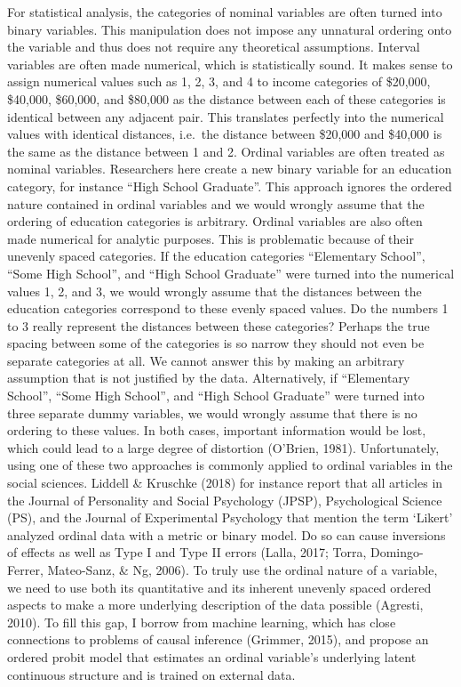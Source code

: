 \documentclass[12pt,econ]{sources/authesis}
\begin{document}
For statistical analysis, the categories of nominal variables are often turned into binary variables. This manipulation does not impose any unnatural ordering onto the variable and thus does not require any theoretical assumptions. Interval variables are often made numerical, which is statistically sound. It makes sense to assign numerical values such as 1, 2, 3, and 4 to income categories of \$20,000, \$40,000, \$60,000, and \$80,000 as the distance between each of these categories is identical between any adjacent pair. This translates perfectly into the numerical values with identical distances, i.e.~the distance between \$20,000 and \$40,000 is the same as the distance between 1 and 2. Ordinal variables are often treated as nominal variables. Researchers here create a new binary variable for an education category, for instance ``High School Graduate''. This approach ignores the ordered nature contained in ordinal variables and we would wrongly assume that the ordering of education categories is arbitrary. Ordinal variables are also often made numerical for analytic purposes. This is problematic because of their unevenly spaced categories. If the education categories ``Elementary School'', ``Some High School'', and ``High School Graduate'' were turned into the numerical values 1, 2, and 3, we would wrongly assume that the distances between the education categories correspond to these evenly spaced values. Do the numbers 1 to 3 really represent the distances between these categories? Perhaps the true spacing between some of the categories is so narrow they should not even be separate categories at all. We cannot answer this by making an arbitrary assumption that is not justified by the data. Alternatively, if ``Elementary School'', ``Some High School'', and ``High School Graduate'' were turned into three separate dummy variables, we would wrongly assume that there is no ordering to these values. In both cases, important information would be lost, which could lead to a large degree of distortion (O'Brien, 1981). Unfortunately, using one of these two approaches is commonly applied to ordinal variables in the social sciences. Liddell \& Kruschke (2018) for instance report that all articles in the Journal of Personality and Social Psychology (JPSP), Psychological Science (PS), and the Journal of Experimental Psychology that mention the term `Likert' analyzed ordinal data with a metric or binary model. Do so can cause inversions of effects as well as Type I and Type II errors (Lalla, 2017; Torra, Domingo-Ferrer, Mateo-Sanz, \& Ng, 2006). To truly use the ordinal nature of a variable, we need to use both its quantitative and its inherent unevenly spaced ordered aspects to make a more underlying description of the data possible (Agresti, 2010). To fill this gap, I borrow from machine learning, which has close connections to problems of causal inference (Grimmer, 2015), and propose an ordered probit model that estimates an ordinal variable's underlying latent continuous structure and is trained on external data.
\end{document}
